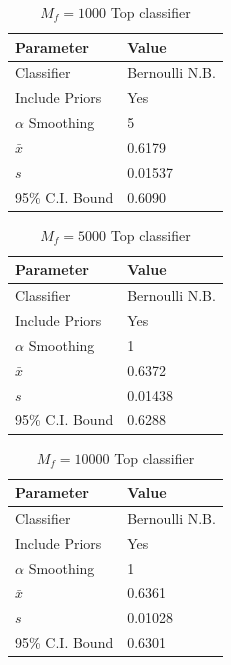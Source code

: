 \documentclass[11pt]{article}
\begin{document}
\begin{table}[H]
	\begin{center}
		\begin{tabular}{|l|l|}			
			\hline
			Parameter & Value \\
			\hline
			Classifier & Bernoulli N.B. \\
			Include Priors & Yes \\
			$\alpha$ Smoothing & 5 \\
			\hline\hline
			$\bar{x}$ &  0.6179\\
			$s$ &  0.01537 \\
			95\% C.I. Bound & 0.6090 \\
			\hline
		\end{tabular}
		\caption{$M_f = 1000$ Top classifier}
		\label{tbl:mf1000}
	\end{center}
\end{table}


\begin{table}[H]
	\begin{center}
		\begin{tabular}{|l|l|}			
			\hline
			Parameter & Value \\
			\hline
			Classifier & Bernoulli N.B. \\
			Include Priors & Yes \\
			$\alpha$ Smoothing & 1 \\
			\hline\hline
			$\bar{x}$ &  0.6372\\
			$s$ & 0.01438 \\
			95\% C.I. Bound & 0.6288 \\
			\hline
		\end{tabular}
		\caption{$M_f = 5000$ Top classifier}
		\label{tbl:mf5000}
	\end{center}
\end{table}

\begin{table}[H]
	\begin{center}
		\begin{tabular}{|l|l|}			
			\hline
			Parameter & Value \\
			\hline
			Classifier & Bernoulli N.B. \\
			Include Priors & Yes \\
			$\alpha$ Smoothing & 1 \\
			\hline\hline
			$\bar{x}$ &  0.6361\\
			$s$ & 0.01028 \\
			95\% C.I. Bound & 0.6301 \\
			\hline
		\end{tabular}
		\caption{$M_f = 10000$ Top classifier}
		\label{tbl:mf10000}
	\end{center}
\end{table}
\end{document}
